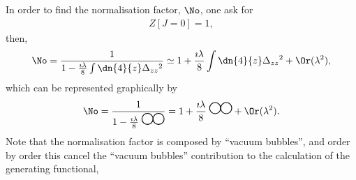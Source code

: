In order to find the normalisation factor, $\No$, one ask for
\begin{align}
  Z[J=0]=1,
\end{align}
then,
\begin{align}
  \No = \frac{1}{1 - \frac{\imath\lambda}{8}\int\dn{4}{z}\Delta_{zz}{}^2} \simeq 1 + \frac{\imath\lambda}{8}\int\dn{4}{z}\Delta_{zz}{}^2+\Or(\lambda^2),
\end{align}
which can be represented graphically by
\begin{align}
  \No = \frac{1}{1 - \frac{\imath\lambda}{8}\;
  \begin{tikzpicture}[thick] %
    \draw (2mm,0) circle (2mm);
    \draw (-2mm,0) circle (2mm);
  \end{tikzpicture}
  }
  = 1 + \frac{\imath\lambda}{8}\;
  \begin{tikzpicture}[thick] %
    \draw (2mm,0) circle (2mm);
    \draw (-2mm,0) circle (2mm);
  \end{tikzpicture}
  +\Or(\lambda^2).
\end{align}
Note that the normalisation factor is composed by ``vacuum bubbles'', and order by order this cancel the ``vacuum bubbles'' contribution to the calculation of the generating functional,
